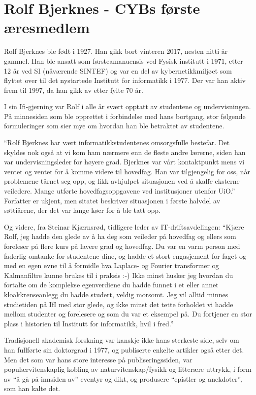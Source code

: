 \chapter[Rolf Bjerknes]{Rolf Bjerknes - CYBs første æresmedlem}

\author{Skrevet av Narve Trædal}

Rolf Bjerknes ble født i 1927. Han gikk bort vinteren 2017, nesten nitti år gammel. Han ble ansatt som førsteamanuensis ved Fysisk institutt i 1971, etter 12 år ved SI (nåværende SINTEF) og var en del av kybernetikkmiljøet som flyttet over til det nystartede Institutt for informatikk i 1977. Der var han
aktiv frem til 1997, da han gikk av etter fylte 70 år.

I sin Ifi-gjerning var Rolf i alle år svært opptatt av studentene og undervisningen. På minnesiden som ble opprettet i forbindelse med hans bortgang, stor følgende formuleringer som sier mye om hvordan han ble betraktet av studentene.

``Rolf Bjerknes har vært informatikkstudentenes omsorgsfulle bestefar. Det skyldes nok også at vi kom ham nærmere enn de fleste andre lærerne, siden han var undervisningsleder for høyere grad. Bjerknes var vårt kontaktpunkt mens vi ventet og ventet for å komme videre til hovedfag. Han var tilgjengelig for oss, når problemene tårnet seg opp, og fikk avhjulpet situasjonen ved å skaffe eksterne veiledere. Mange utførte hovedfagsoppgavene ved institusjoner utenfor UiO.'' Forfatter er ukjent, men sitatet beskriver situasjonen i første halvdel av søttiårene, der det var lange køer for å ble tatt opp.

Og videre, fra Steinar Kjærnsrød, tidligere leder av IT-driftsavdelingen: ``Kjære Rolf, jeg hadde den glede av å ha deg som veileder på hovedfag og ellers som foreleser på flere kurs på lavere grad og hovedfag. Du var en varm person med faderlig omtanke for studentene dine, og hadde et stort engasjement for faget og med en egen evne til å formidle hva Laplace- og Fourier transformer og Kalmanfiltre kunne brukes til i praksis :-) Ikke minst husker jeg hvordan du fortalte om de komplekse egenverdiene du hadde funnet i et eller annet kloakkrenseanlegg du hadde studert, veldig morsomt. Jeg vil alltid minnes studietiden på IfI med stor glede, og ikke minst det tette forholdet vi hadde mellom studenter og forelesere og som du var et eksempel på. Du fortjener en stor plass i historien til Institutt for informatikk, hvil i fred.''


Tradisjonell akademisk forskning var kanskje ikke hans sterkeste side, selv om han fullførte sin doktorgrad i 1977, og publiserte enkelte artikler også etter det. Men det som var hans store interesse på publiseringssiden, var populærvitenskaplig kobling av naturvitenskap\slash fysikk og litterære uttrykk, i form av ``å gå på innsiden av'' eventyr og dikt, og produsere ``epistler og anekdoter'', som han kalte det.
